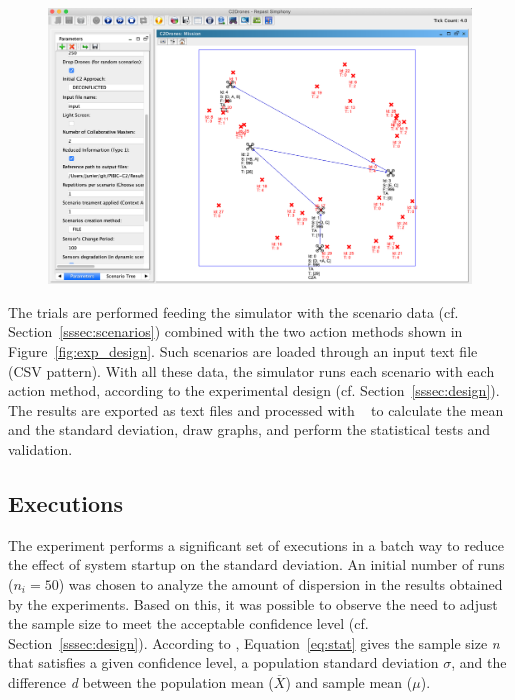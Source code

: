 \begin{figure}[ht]
  \centering
  \includegraphics[width=0.7\linewidth]{img/repast01.png}
  \label{fig:repast01}
\end{figure}


The trials are performed feeding the simulator with the scenario data (cf. Section~\ref{sssec:scenarios}) combined with the two action methods shown in Figure~\ref{fig:exp_design}. Such scenarios are loaded through an input text file (CSV pattern). With all these data, the simulator runs each scenario with each action method, according to the experimental design (cf. Section~\ref{sssec:design}). The results are exported as text files and processed with ~\citep{stat002,R_G} to calculate the mean and the standard deviation, draw graphs, and perform the statistical tests and validation.


\subsection{Executions}
\label{subsec:operations}

The experiment performs a significant set of executions in a batch way to reduce the effect of system startup on the standard deviation. An initial number of runs ($n_i=50$) was chosen to analyze the amount of dispersion in the results obtained by the experiments. Based on this, it was possible to observe the need to adjust the sample size to meet the acceptable confidence level (cf. Section~\ref{sssec:design}). According to \citet{CochranW.G.1983}, Equation~\ref{eq:stat} gives the sample size \emph{n} that satisfies a given confidence level, a population standard deviation $\sigma$, and the difference \emph{d} between the population mean ($\overline{X}$) and sample mean ($\mu$).

